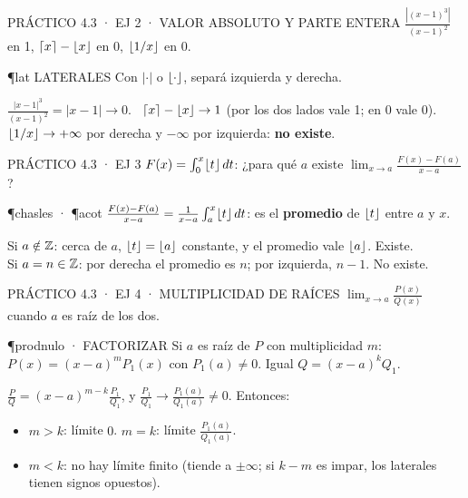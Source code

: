 \begin{enunciado}{PRÁCTICO 4.3 · EJ 2 · VALOR ABSOLUTO Y PARTE ENTERA}
$\frac{|(x-1)^3|}{(x-1)^2}$ en 1, $\lceil x\rceil-\lfloor x\rfloor$ en 0, $\lfloor 1/x\rfloor$ en 0.
\end{enunciado}
\begin{uso}{\P{lat} LATERALES}
Con $|\cdot|$ o $\lfloor \cdot\rfloor$, separá izquierda y derecha.
\end{uso}
$\frac{|x-1|^3}{(x-1)^2}=|x-1|\to0$. \ $\lceil x\rceil-\lfloor x\rfloor\to1$ (por los dos lados vale 1; en 0 vale 0). \ $\lfloor 1/x\rfloor\to+\infty$ por derecha y $-\infty$ por izquierda: \textbf{no existe}.

\begin{enunciado}{PRÁCTICO 4.3 · EJ 3}
$F(x)=\int_0^x\lfloor t\rfloor\,dt$: ¿para qué $a$ existe $\lim_{x\to a}\frac{F(x)-F(a)}{x-a}$?
\end{enunciado}
\begin{uso}{\P{chasles} · \P{acot}}
$\frac{F(x)-F(a)}{x-a}=\frac1{x-a}\int_a^x\lfloor t\rfloor\,dt$: es el \textbf{promedio} de $\lfloor t\rfloor$ entre $a$ y $x$.
\end{uso}
Si $a\notin\mathbb{Z}$: cerca de $a$, $\lfloor t\rfloor=\lfloor a\rfloor$ constante, y el promedio vale $\lfloor a\rfloor$. Existe.\\
Si $a=n\in\mathbb{Z}$: por derecha el promedio es $n$; por izquierda, $n-1$. No existe.

\begin{enunciado}{PRÁCTICO 4.3 · EJ 4 · MULTIPLICIDAD DE RAÍCES}
$\lim_{x\to a}\frac{P(x)}{Q(x)}$ cuando $a$ es raíz de los dos.
\end{enunciado}
\begin{uso}{\P{prodnulo} · FACTORIZAR}
Si $a$ es raíz de $P$ con multiplicidad $m$: $P(x)=(x-a)^mP_1(x)$ con $P_1(a)\neq0$. Igual $Q=(x-a)^kQ_1$.
\end{uso}
$\frac PQ=(x-a)^{m-k}\frac{P_1}{Q_1}$, y $\frac{P_1}{Q_1}\to\frac{P_1(a)}{Q_1(a)}\neq0$. Entonces:
\begin{itemize}
\item $m>k$: límite $0$. \quad $m=k$: límite $\frac{P_1(a)}{Q_1(a)}$.
\item $m<k$: no hay límite finito (tiende a $\pm\infty$; si $k-m$ es impar, los laterales tienen signos opuestos).
\end{itemize}


